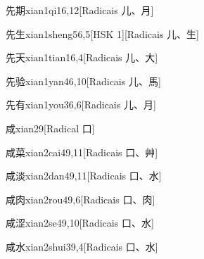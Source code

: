 \begin{entry}{先期}{xian1qi1}{6,12}[Radicais ⼉、⽉]
\end{entry}

\begin{entry}{先生}{xian1sheng5}{6,5}[HSK 1][Radicais ⼉、⽣]
\end{entry}

\begin{entry}{先天}{xian1tian1}{6,4}[Radicais ⼉、⼤]
\end{entry}

\begin{entry}{先验}{xian1yan4}{6,10}[Radicais ⼉、⾺]
\end{entry}

\begin{entry}{先有}{xian1you3}{6,6}[Radicais ⼉、⽉]
\end{entry}

\begin{entry}{咸}{xian2}{9}[Radical ⼝]
\end{entry}

\begin{entry}{咸菜}{xian2cai4}{9,11}[Radicais ⼝、⾋]
\end{entry}

\begin{entry}{咸淡}{xian2dan4}{9,11}[Radicais ⼝、⽔]
\end{entry}

\begin{entry}{咸肉}{xian2rou4}{9,6}[Radicais ⼝、⾁]
\end{entry}

\begin{entry}{咸涩}{xian2se4}{9,10}[Radicais ⼝、⽔]
\end{entry}

\begin{entry}{咸水}{xian2shui3}{9,4}[Radicais ⼝、⽔]
\end{entry}

